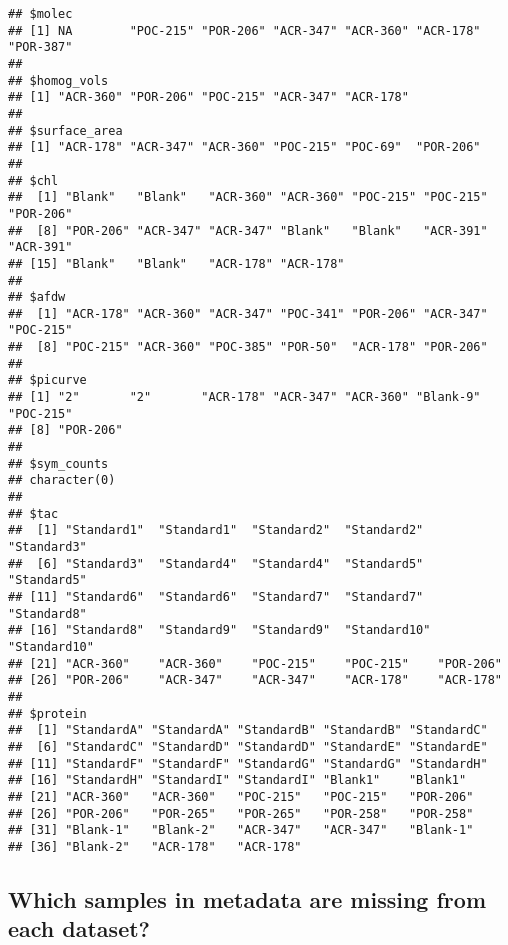 \documentclass[]{article}
\begin{document}
\begin{verbatim}
## $molec
## [1] NA        "POC-215" "POR-206" "ACR-347" "ACR-360" "ACR-178" "POR-387"
## 
## $homog_vols
## [1] "ACR-360" "POR-206" "POC-215" "ACR-347" "ACR-178"
## 
## $surface_area
## [1] "ACR-178" "ACR-347" "ACR-360" "POC-215" "POC-69"  "POR-206"
## 
## $chl
##  [1] "Blank"   "Blank"   "ACR-360" "ACR-360" "POC-215" "POC-215" "POR-206"
##  [8] "POR-206" "ACR-347" "ACR-347" "Blank"   "Blank"   "ACR-391" "ACR-391"
## [15] "Blank"   "Blank"   "ACR-178" "ACR-178"
## 
## $afdw
##  [1] "ACR-178" "ACR-360" "ACR-347" "POC-341" "POR-206" "ACR-347" "POC-215"
##  [8] "POC-215" "ACR-360" "POC-385" "POR-50"  "ACR-178" "POR-206"
## 
## $picurve
## [1] "2"       "2"       "ACR-178" "ACR-347" "ACR-360" "Blank-9" "POC-215"
## [8] "POR-206"
## 
## $sym_counts
## character(0)
## 
## $tac
##  [1] "Standard1"  "Standard1"  "Standard2"  "Standard2"  "Standard3" 
##  [6] "Standard3"  "Standard4"  "Standard4"  "Standard5"  "Standard5" 
## [11] "Standard6"  "Standard6"  "Standard7"  "Standard7"  "Standard8" 
## [16] "Standard8"  "Standard9"  "Standard9"  "Standard10" "Standard10"
## [21] "ACR-360"    "ACR-360"    "POC-215"    "POC-215"    "POR-206"   
## [26] "POR-206"    "ACR-347"    "ACR-347"    "ACR-178"    "ACR-178"   
## 
## $protein
##  [1] "StandardA" "StandardA" "StandardB" "StandardB" "StandardC"
##  [6] "StandardC" "StandardD" "StandardD" "StandardE" "StandardE"
## [11] "StandardF" "StandardF" "StandardG" "StandardG" "StandardH"
## [16] "StandardH" "StandardI" "StandardI" "Blank1"    "Blank1"   
## [21] "ACR-360"   "ACR-360"   "POC-215"   "POC-215"   "POR-206"  
## [26] "POR-206"   "POR-265"   "POR-265"   "POR-258"   "POR-258"  
## [31] "Blank-1"   "Blank-2"   "ACR-347"   "ACR-347"   "Blank-1"  
## [36] "Blank-2"   "ACR-178"   "ACR-178"
\end{verbatim}

\subsection{Which samples in metadata are missing from each
dataset?}\label{which-samples-in-metadata-are-missing-from-each-dataset}
\end{document}
